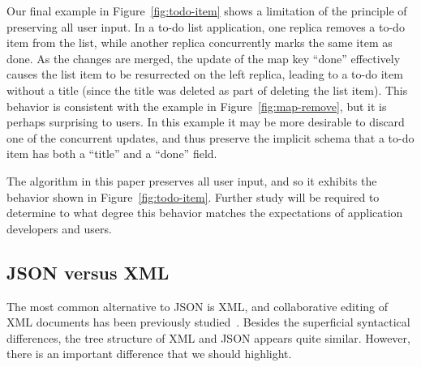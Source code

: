 \documentclass[10pt,journal,compsoc]{IEEEtran}
\begin{document}
\begin{figure*}
\centering
{}
\caption{One replica removes a list element, while another concurrently updates its contents}\label{fig:todo-item}
\end{figure*}

Our final example in Figure~\ref{fig:todo-item} shows a limitation of the principle of preserving all user input. In a to-do list application, one replica removes a to-do item from the list, while another replica concurrently marks the same item as done. As the changes are merged, the update of the map key ``done'' effectively causes the list item to be resurrected on the left replica, leading to a to-do item without a title (since the title was deleted as part of deleting the list item). This behavior is consistent with the example in Figure~\ref{fig:map-remove}, but it is perhaps surprising to users. In this example it may be more desirable to discard one of the concurrent updates, and thus preserve the implicit schema that a to-do item has both a ``title'' and a ``done'' field.

The algorithm in this paper preserves all user input, and so it exhibits the behavior shown in Figure~\ref{fig:todo-item}. Further study will be required to determine to what degree this behavior matches the expectations of application developers and users.

\subsection{JSON versus XML}

The most common alternative to JSON is XML, and collaborative editing of XML documents has been previously studied~\cite{Davis:2002iv,Ignat:2003jy,Wang:2015vo}. Besides the superficial syntactical differences, the tree structure of XML and JSON appears quite similar. However, there is an important difference that we should highlight.
\end{document}
